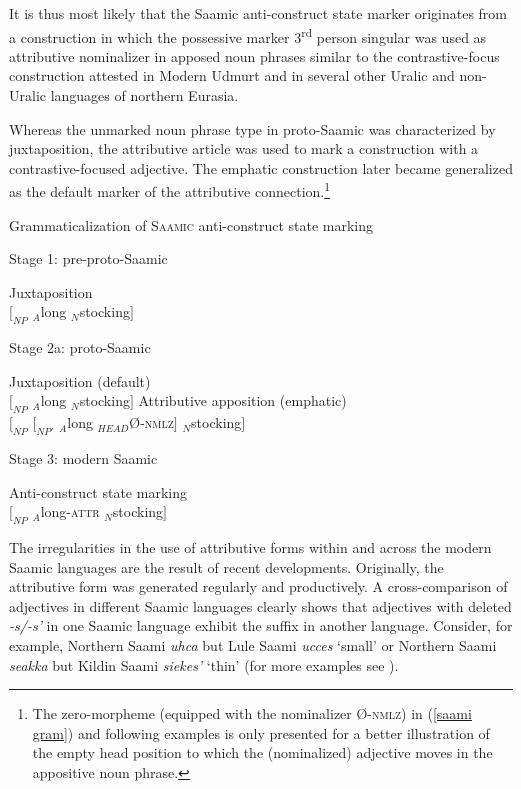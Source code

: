 {It is thus most likely that the Saamic anti-construct state marker originates from a construction in which the possessive marker 3\textsuperscript{rd} person singular was used as attributive nominalizer in apposed noun phrases similar to the contrastive-focus construction attested in Modern Udmurt and in several other Uralic and non-Uralic languages of northern Eurasia.

Whereas the unmarked noun phrase type in proto-Saamic was characterized by juxtaposition, the attributive article was used to mark a construction with a contrastive-focused adjective. The emphatic construction later became generalized as the default marker of the attributive connection.\footnote{The zero-morpheme (equipped with the nominalizer Ø-\textsc{nmlz}) in (\ref{saami gram}) and following examples is only presented for a better illustration of the empty head position to which the (nominalized) adjective moves in the appositive noun phrase.}

\begin{exe}
\ex 	Grammaticalization of \textsc{Saamic} anti-construct state marking\label{saami gram}
\begin{xlist}
\ex	Stage 1: pre-proto-Saamic
\begin{xlist}
\ex	Juxtaposition\\
	$[_{NP}$ $_{A}$long $_{N}$stocking$]$
\end{xlist}
\ex	Stage 2a: proto-Saamic
\begin{xlist}
\ex	Juxtaposition (default)\\
	$[_{NP}$ $_{A}$long $_{N}$stocking$]$
\ex	Attributive apposition (emphatic)\\
	$[_{NP}$ $[_{NP'}$ $_{A}$long $_{HEAD}$Ø-\textsc{nmlz}$]$ $_{N}$stocking$]$
\end{xlist}
\ex	Stage 3: modern Saamic
\begin{xlist}
\ex	Anti-construct state marking\\
	$[_{NP}$ $_{A}$long-\textsc{attr} $_{N}$stocking$]$
\end{xlist}
\end{xlist}
\end{exe}
The irregularities in the use of attributive forms within and across the modern Saamic languages are the result of recent developments. Originally, the attributive form was generated regularly and productively. A cross-comparison of adjectives in different Saamic languages clearly shows that adjectives with deleted \textit{-s/-s'} in one Saamic language exhibit the suffix in another language. Consider, for example, Northern Saami \textit{uhca} but Lule Saami \textit{ucces} ‘small’ or Northern Saami \textit{seakka} but Kildin Saami \textit{sie{\ng}{\ng}kes'} ‘thin’ (for more examples see \citealt{riesler2006b}).

}
